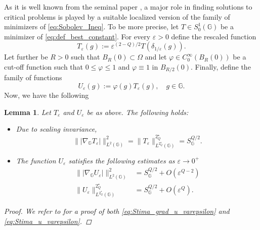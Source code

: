 \documentclass[11pt]{amsart}
\numberwithin{equation}{section} %
\newtheorem{lemma}[teo]{Lemma}
\theoremstyle{definition}
\begin{document}
As it is well known from the seminal paper \cite{BN}, a major role in finding solutions to critical problems is played by a suitable localized version of the family of minimizers of \eqref{eq:Sobolev_Ineq}. To be more precise, let $T \in S^{1}_{0}(\mathbb{G})$ be a minimizer of \eqref{eq:def_best_constant}. For every $\varepsilon >0$ define the rescaled function
\begin{equation}\label{eq:Minimi_riscalati}
	T_{\varepsilon}(g) := \varepsilon^{(2-Q)/2} T \left(\delta_{1/\varepsilon}(g)\right).
\end{equation}
Let further be $R>0$ such that $B_{R}(0)\subset \Omega$ and let $\varphi \in C^{\infty}_{0}(B_{R}(0))$ be a cut-off function such that $0\leq \varphi \leq 1$ and $\varphi \equiv 1$ in $B_{R/2}(0)$. Finally, define the family of functions 
\begin{equation}\label{eq:def_u_varepsilon}
	U_{\varepsilon}(g):= \varphi(g) T_{\varepsilon}(g), \quad g \in \mathbb{G}.
\end{equation}
Now, we have the following

\begin{lemma}\label{lem:Stime_Talentiane_modificate}
	Let $T_{\varepsilon}$ and $U_{\varepsilon}$ be as above.
	The following holds:
	\begin{itemize}
			\item[i)] Due to scaling invariance, 
		\begin{equation}
			\| |\nabla_{\mathbb{G}}T_{\varepsilon}|\|^{2}_{L^{2}(\mathbb{G})} = \| T_{\varepsilon}\|^{2^{\star}_{Q}}_{L^{2_{Q}^{\star}}(\mathbb{G})} = S_{\mathbb{G}}^{Q/2}.
		\end{equation}
		\item[ii)] The function $U_{\varepsilon}$ satisfies the following estimates as $\varepsilon \to 0^{+}$
		\begin{align}
			\| |\nabla_{\mathbb{G}}U_{\varepsilon}|\|^{2}_{L^{2}(\mathbb{G})} & =  S_{\mathbb{G}}^{Q/2} + O(\varepsilon^{Q-2}) \label{eq:Stima_grad_u_varepsilon}\\
			\|U_{\varepsilon}\|^{2^{\star}_{Q}}_{L^{2_{Q}^{\star}}(\mathbb{G})}& = S_{\mathbb{G}}^{Q/2} + O(\varepsilon^{Q}) \label{eq:Stima_u_varepsilon}. 
		\end{align}
	\end{itemize}	
	\begin{proof}
		We refer to \cite[Lemma 3.3]{Loiudice1} for a proof of both \eqref{eq:Stima_grad_u_varepsilon} and \eqref{eq:Stima_u_varepsilon}.
	\end{proof}
\end{lemma}
 
\end{document}
